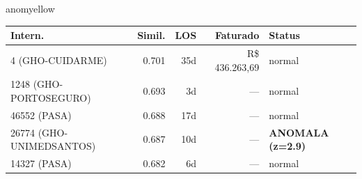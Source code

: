 \documentclass[a4paper,10pt]{article}
\begin{document}
\begin{anomalycard}[Internacao 9893 | GHO-PETROBRAS | MODERADO (z=2.25)]{anomyellow}
\begin{tabular}{l r r r l}\toprule\textbf{Intern.} & \textbf{Simil.} & \textbf{LOS} & \textbf{Faturado} & \textbf{Status} \\\midrule
4 (GHO-CUIDARME) & 0.701 & 35d & R\$ 436.263,69 & \textcolor{jcubeblue}{normal} \\
1248 (GHO-PORTOSEGURO) & 0.693 & 3d & --- & \textcolor{jcubeblue}{normal} \\
46552 (PASA) & 0.688 & 17d & --- & \textcolor{jcubeblue}{normal} \\
26774 (GHO-UNIMEDSANTOS) & 0.687 & 10d & --- & \textcolor{anomred}{\textbf{ANOMALA (z=2.9)}} \\
14327 (PASA) & 0.682 & 6d & --- & \textcolor{jcubeblue}{normal} \\
\bottomrule\end{tabular}


\end{anomalycard}

\newpage
\end{document}
